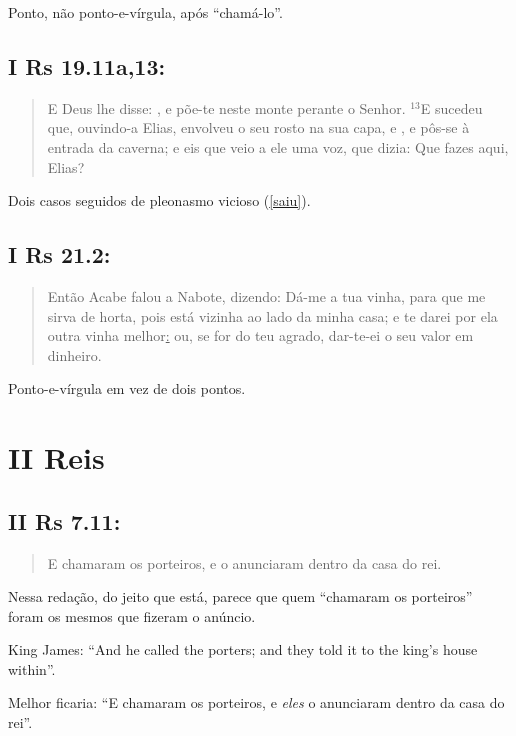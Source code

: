 Ponto, não ponto-e-vírgula, após ``chamá-lo''.

\subsection*{I Rs 19.11a,13:} 
\begin{quote}
    \small
E Deus lhe disse: , e põe-te neste monte perante o Senhor. $^{\mathrm{13}}$E sucedeu que, ouvindo-a Elias, envolveu o seu rosto na sua capa, e , e pôs-se à entrada da caverna; e eis que veio a ele uma voz, que dizia: Que fazes aqui, Elias?
\end{quote}

Dois casos seguidos de pleonasmo vicioso (\ref{saiu}).

\subsection*{I Rs 21.2:} 
\begin{quote}
    \small
Então Acabe falou a Nabote, dizendo: Dá-me a tua vinha, para que me sirva de horta, pois está vizinha ao lado da minha casa; e te darei por ela outra vinha melhor\uline{:} ou, se for do teu agrado, dar-te-ei o seu valor em dinheiro.
\end{quote}

Ponto-e-vírgula em vez de dois pontos.

\section{II Reis}
\subsection*{II Rs 7.11:} 
\begin{quote}
    \small
E chamaram os porteiros, e o anunciaram dentro da casa do rei.
\end{quote}

Nessa redação, do jeito que está, parece que quem ``chamaram os porteiros'' foram os mesmos que fizeram o anúncio.

King James: ``And he called the porters; and they told it to the king's house within''.

Melhor ficaria: ``E chamaram os porteiros, e \emph{eles} o anunciaram dentro da casa do rei''.

